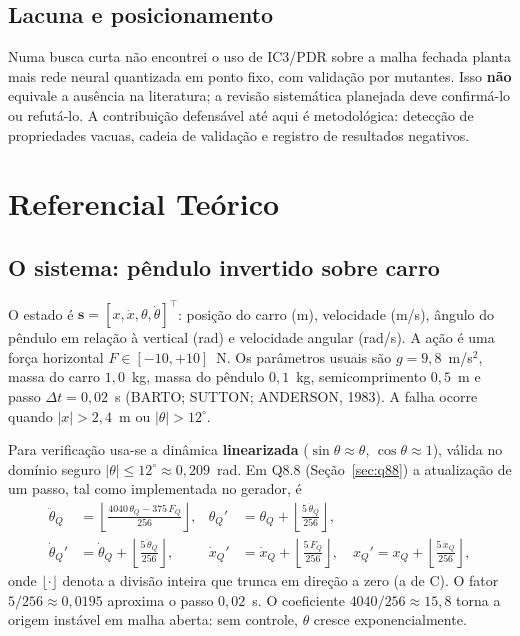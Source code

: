 \documentclass[12pt,openright,oneside,a4paper,chapter=TITLE,sumario=tradicional,english,brazil]{abntex2}
\begin{document}
\section{Lacuna e posicionamento}

Numa busca curta não encontrei o uso de IC3/PDR sobre a malha fechada planta mais rede neural quantizada em ponto fixo, com validação por mutantes. Isso \textbf{não} equivale a ausência na literatura; a revisão sistemática planejada deve confirmá-lo ou refutá-lo. A contribuição defensável até aqui é metodológica: detecção de propriedades vacuas, cadeia de validação e registro de resultados negativos.

\chapter{Referencial Teórico}\label{cap:fund}

\section{O sistema: pêndulo invertido sobre carro}

O estado é $\mathbf{s}=[x,\dot x,\theta,\dot\theta]^\top$: posição do carro (m), velocidade (m/s), ângulo do pêndulo em relação à vertical (rad) e velocidade angular (rad/s). A ação é uma força horizontal $F\in[-10,+10]$~N. Os parâmetros usuais são $g=9{,}8$~m/s$^2$, massa do carro $1{,}0$~kg, massa do pêndulo $0{,}1$~kg, semicomprimento $0{,}5$~m e passo $\Delta t=0{,}02$~s (BARTO; SUTTON; ANDERSON, 1983). A falha ocorre quando $|x|>2{,}4$~m ou $|\theta|>12^\circ$.

Para verificação usa-se a dinâmica \textbf{linearizada} ($\sin\theta\approx\theta$, $\cos\theta\approx 1$), válida no domínio seguro $|\theta|\le 12^\circ\approx0{,}209$~rad. Em Q8.8 (Seção~\ref{sec:q88}) a atualização de um passo, tal como implementada no gerador, é
\begin{align}
  \ddot\theta_Q &= \left\lfloor\frac{4040\,\theta_Q - 375\,F_Q}{256}\right\rfloor, &
  \theta_Q' &= \theta_Q + \left\lfloor\frac{5\,\dot\theta_Q}{256}\right\rfloor, \label{eq:din1}\\
  \dot\theta_Q' &= \dot\theta_Q + \left\lfloor\frac{5\,\ddot\theta_Q}{256}\right\rfloor, &
  \dot x_Q' &= \dot x_Q + \left\lfloor\frac{5\,F_Q}{256}\right\rfloor, \quad x_Q' = x_Q + \left\lfloor\frac{5\,\dot x_Q}{256}\right\rfloor, \label{eq:din2}
\end{align}
onde $\lfloor\cdot\rfloor$ denota a divisão inteira que trunca em direção a zero (a de C). O fator $5/256\approx0{,}0195$ aproxima o passo $0{,}02$~s. O coeficiente $4040/256\approx15{,}8$ torna a origem instável em malha aberta: sem controle, $\theta$ cresce exponencialmente.
\end{document}
